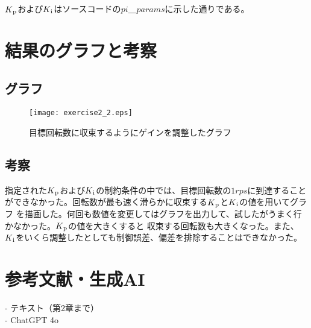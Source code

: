 \documentclass[10pt,a4paper,titlepage]{jreport} %
\begin{document}
$K\textsubscript{p}$および$K\textsubscript{i}$はソースコードの$pi＿params$に示した通りである。

\chapter{結果のグラフと考察}

\section{グラフ}
\begin{figure}[htbp]
  \centering
  \texttt{[image: exercise2\_2.eps]}
  \caption{目標回転数に収束するようにゲインを調整したグラフ}
  \label{fig:epsimage}
\end{figure}

\section{考察}
指定された$K\textsubscript{p}$および$K\textsubscript{i}$の制約条件の中では、目標回転数の$1rps$に到達すること
ができなかった。回転数が最も速く滑らかに収束する$K\textsubscript{p}$と$K\textsubscript{i}$の値を用いてグラフ
を描画した。何回も数値を変更してはグラフを出力して、試したがうまく行かなかった。$K\textsubscript{p}$の値を大きくすると
収束する回転数も大きくなった。また、$K\textsubscript{i}$をいくら調整したとしても制御誤差、偏差を排除することはできなかった。

\chapter{参考文献・生成AI}
- テキスト（第2章まで）\\
- ChatGPT 4o
\end{document}
